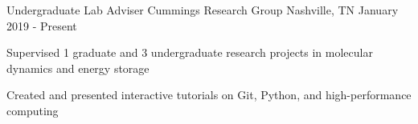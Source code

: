 
\begin{cventries}
  \cventry
    {Undergraduate Lab Adviser} %
    {Cummings Research Group} %
    {Nashville, TN} %
    {January 2019 - Present} %
    {
      \begin{cvitems} %
        \item {Supervised 1 graduate and 3 undergraduate research 
            projects in molecular dynamics and energy storage}
        \item {Created and presented interactive tutorials on Git, Python, and
            high-performance computing}
      \end{cvitems}
    }
\end{cventries}
